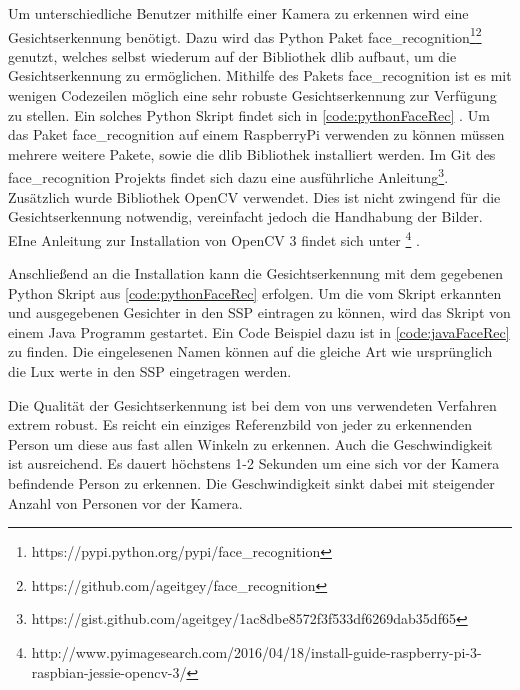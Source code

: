 Um unterschiedliche Benutzer mithilfe einer Kamera zu erkennen wird eine Gesichtserkennung benötigt. Dazu wird das Python Paket face\_recognition\footnote{https://pypi.python.org/pypi/face\_recognition}\footnote{https://github.com/ageitgey/face\_recognition} genutzt, welches selbst wiederum auf der Bibliothek dlib aufbaut, um die Gesichtserkennung zu ermöglichen. Mithilfe des Pakets face\_recognition ist es mit wenigen Codezeilen möglich eine sehr robuste Gesichtserkennung zur Verfügung zu stellen. Ein solches Python Skript findet sich in \ref{code:pythonFaceRec} . Um das Paket face\_recognition auf einem RaspberryPi verwenden zu können müssen mehrere weitere Pakete, sowie die dlib Bibliothek installiert werden. Im Git des face\_recognition Projekts findet sich dazu eine ausführliche Anleitung\footnote{https://gist.github.com/ageitgey/1ac8dbe8572f3f533df6269dab35df65}.
Zusätzlich wurde Bibliothek OpenCV verwendet. Dies ist nicht zwingend für die Gesichtserkennung notwendig, vereinfacht jedoch die Handhabung der Bilder.
EIne Anleitung zur Installation von OpenCV 3 findet sich unter \footnote{http://www.pyimagesearch.com/2016/04/18/install-guide-raspberry-pi-3-raspbian-jessie-opencv-3/} .

Anschließend an die Installation kann die Gesichtserkennung mit dem gegebenen Python Skript aus \ref{code:pythonFaceRec} erfolgen. Um die vom Skript erkannten und ausgegebenen Gesichter in den SSP eintragen zu können, wird das Skript von einem Java Programm gestartet. Ein Code Beispiel dazu ist in \ref{code:javaFaceRec} zu finden. Die eingelesenen Namen können auf die gleiche Art wie ursprünglich die Lux werte in den SSP eingetragen werden.

Die Qualität der Gesichtserkennung ist bei dem von uns verwendeten Verfahren extrem robust. Es reicht ein einziges Referenzbild von jeder zu erkennenden Person um diese aus fast allen Winkeln zu erkennen. Auch die Geschwindigkeit ist ausreichend. Es dauert höchstens 1-2 Sekunden um eine sich vor der Kamera befindende Person zu erkennen. Die Geschwindigkeit sinkt dabei mit steigender Anzahl von Personen vor der Kamera. 


